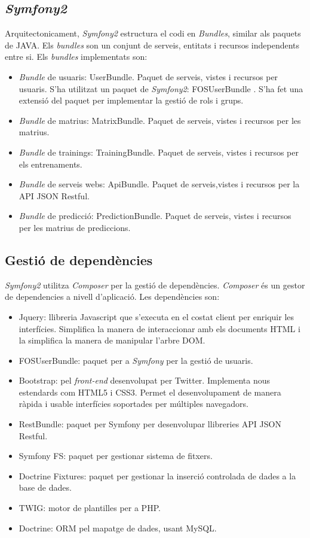 \subsection{\textit{Symfony2}}
Arquitectonicament, \textit{Symfony2} estructura el codi en \textit{Bundles}, similar als paquets de JAVA. Els \textit{bundles} son un conjunt de serveis, entitats i recursos independents entre si. Els \textit{bundles} implementats son:
\begin{itemize}
\item \textit{Bundle} de usuaris: UserBundle. Paquet de serveis, vistes i recursos per usuaris. S'ha utilitzat un paquet de \textit{Symfony2}: FOSUserBundle \cite{fosuserbundle}. S'ha fet una extensi\'{o} del paquet per implementar la gesti\'{o} de rols i grups.
\item \textit{Bundle} de matrius: MatrixBundle. Paquet de serveis, vistes i recursos per les matrius.
\item \textit{Bundle} de trainings: TrainingBundle. Paquet de serveis, vistes i recursos per els entrenaments.
\item \textit{Bundle} de serveis webs: ApiBundle. Paquet de serveis,vistes i recursos per la API JSON Restful. 
\item \textit{Bundle} de predicci\'{o}: PredictionBundle. Paquet de serveis, vistes i recursos per les matrius de prediccions.
\end{itemize}

\subsection{Gesti\'{o} de depend\`{e}ncies} 
\textit{Symfony2} utilitza \textit{Composer} per la gesti\'{o} de depend\`{e}ncies. \textit{Composer} \'{e}s un gestor de dependencies a nivell d'aplicaci\'{o}. Les depend\`{e}ncies son:
\begin{itemize}
\item Jquery: llibreria Javascript que s'executa en el costat client per enriquir les interfícies. Simplifica la manera de interaccionar amb els documents HTML i la simplifica la manera de manipular l'arbre DOM.
\item FOSUserBundle: paquet per a \textit{Symfony} per la gesti\'{o} de usuaris. 
\item Bootstrap:  pel \textit{front-end} desenvolupat per Twitter. Implementa nous estendards com HTML5 i CSS3. Permet el desenvolupament de manera r\`{a}pida i usable interf\'{i}cies soportades per múltiples navegadors.
\item RestBundle: paquet per Symfony per desenvolupar llibreries API JSON Restful.
\item Symfony FS: paquet per gestionar sistema de fitxers.
\item Doctrine Fixtures: paquet per gestionar la inserci\'{o} controlada de dades a la base de dades.
\item TWIG: motor de plantilles per a PHP.
\item Doctrine: ORM pel mapatge de dades, usant MySQL.
\end{itemize}

